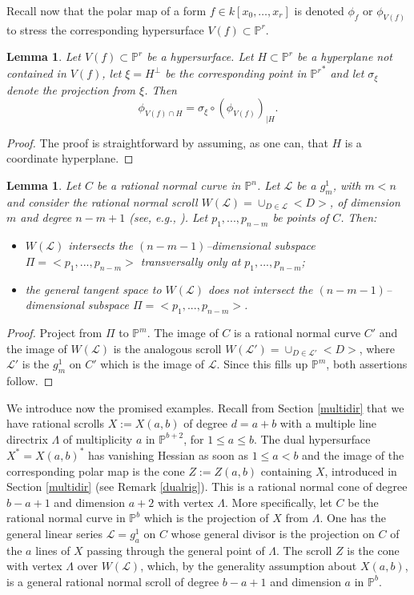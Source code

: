\documentclass[11pt]{article}   %
\newtheorem{Lemma}[Theorem]{Lemma}
\theoremstyle{definition}
\numberwithin{Theorem}{section} \numberwithin{equation}{section}
\renewcommand{\L}{{\mathcal L}}
\newcommand{\p}{{\mathbb P}}
\begin{document}
{Recall now that the polar map
of a form $f\in k[x_0,\ldots, x_r]$ is denoted $\phi_f$ or
$\phi_{V(f)}$ to stress the corresponding hypersurface $V(f)\subset
\p^r$.

\begin{Lemma}\label {projpoint} Let $V(f)\subset \p^ r$ be a
hypersurface. Let $H\subset \p^ r$ be a hyperplane  not contained in
$V(f)$, let $\xi=H^ \perp$ be the corresponding point in ${\p^ r}^*$
and let $\sigma_{\xi}$ denote the projection from $\xi$. Then
$$\phi_{V(f)\cap H}= \sigma_\xi\circ ({\phi}_{V(f)})_{|H}.$$
\end{Lemma}

\begin{proof} The proof is
straightforward by assuming, as one can, that $H$ is a coordinate
hyperplane.\end{proof}

\begin{Lemma}\label{ratcurve} Let $C$ be  a rational normal curve in
$\p^ n$. Let $\L$ be a $g^ 1_m$, with $m<n$ and consider the
rational normal scroll $W(\L)=\cup_{D\in \L}<D>$, of dimension $m$
and degree $n-m+1$ {\rm (}see, e.g., {\rm \cite{EH})}. Let
$p_1,...,p_{n-m}$ be points of $C$. Then:
\begin{itemize}
\item[{\rm (i)}] $W(\L)$ intersects the
$(n-m-1)$--dimensional subspace $\Pi=<p_1,...,p_{n-m}>$
transversally only at $p_1,...,p_{n-m}${\rm ;}
\item[{\rm (ii)}] the general tangent space to $W(\L)$ does not intersect the
$(n-m-1)$--dimensional subspace $\Pi=<p_1,...,p_{n-m}>$.
\end{itemize}
\end{Lemma}

\begin{proof}  Project from $\Pi$ to $\p^ {m}$.
The image of $C$ is a rational normal curve $C'$ and the image of
$W(\L)$ is the analogous scroll $W(\L')=\cup_{D\in \L'}<D>$, where
$\L'$ is the  $g^ 1_m$ on $C'$ which is the image of $\L$. Since
this fills up $\p^ {m}$, both assertions follow.
\end{proof}

We introduce now the promised examples. Recall
 from { Section} \ref{multidir} that we have
rational scrolls $X:=X(a,b)$ of degree $d=a+b$ with a multiple line
directrix $\Lambda$ of multiplicity $a$ in $\p^ {b+2}$, for $1\leq
a\leq b$. The dual hypersurface $X^
*=X(a,b)^ *$ has vanishing Hessian as soon as $1\leq a<b$ and the
image of the corresponding polar map is the cone $Z:=Z(a,b)$
containing $X$,   introduced in {
Section}  \ref{multidir} (see Remark \ref{dualrig}). This is a
rational normal cone of degree $b-a+1$ and dimension $a+2$ with
vertex $\Lambda$. More specifically, let $C$ be the rational normal
curve in $\p^ b$ which is the projection of $X$ from $\Lambda$. One
has the general linear series $\L=g_a^ 1$ on $C$ whose general
divisor is the projection on $C$ of the $a$ lines of $X$ passing
through the general point of $\Lambda$. The scroll $Z$ is the cone
with vertex $\Lambda$ over $W(\L)$, which, by  the generality
assumption about $X(a,b)$, is a general rational normal scroll of
degree
 $b-a+1$ and dimension $a$ in $\p^ b$.
 \medskip


}
\end{document}

